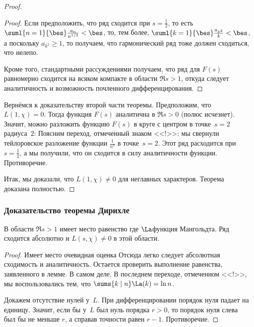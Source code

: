 \documentclass[a4paper]{article}
\begin{document}
\begin{proof}
\begin{proof}
Если предположить, что ряд сходится при $s = \frac12$, то есть $\suml{n=1}{\bes}\frac{a_n}{n^{1/2}}<\bes$,
то, тем более, $\suml{k=1}{\bes}\frac{a_{k^2}}{k}<\bes$, а поскольку $a_{k^2} \ge 1$, то получаем,
что гармонический ряд тоже должен сходиться, что нелепо.

Кроме того, стандартными рассуждениями получаем, что ряд для $F(s)$ равномерно сходится на всяком компакте в области
$\Re s>1$, откуда следует аналитичность и возможность почленного дифференцирования.
\end{proof}

Вернёмся к доказательству второй части теоремы. Предположим, что $L(1,\chi)=0$. Тогда
функция $F(s)$ аналитична в $\Re s>0$ (полюс исчезнет). Значит, можно разложить функцию $F(s)$
в круге с центром в точке~$s=2$ радиуса~$2$:
Поясним переход, отмеченный знаком <<!>>: мы свернули тейлоровское разложение функции $\frac{1}{n^s}$ в точке~${s=2}$.
Этот ряд расходится при $s=\frac12$, а мы получили, что он сходится в силу аналитичности функции.
Противоречие.

Итак, мы доказали, что $L(1,\chi) \neq 0$ для неглавных характеров. Теорема доказана полностью.
\end{proof}

\subsubsection{Доказательство теоремы Дирихле}

\begin{lemma}
В области $\Re s>1$ имеет место равенство
где $\La$\т функция Мангольдта. Ряд сходится абсолютно и $L(s,\chi)\neq 0$ в этой области.
\end{lemma}
\begin{proof}
Имеет место очевидная оценка
Отсюда легко следует абсолютная сходимость и аналитичность. Остается проверить выполнение
равенства, заявленного в лемме. В самом деле,
В последнем переходе, отмеченном <<!>>, мы воспользовались тем, что $\sums{k\mid n}\La(k)=\ln n$.

Докажем отсутствие нулей у~$L$. При дифференцировании порядок нуля падает на единицу.
Значит, если бы у~$L$ был нуль порядка $r > 0$, то порядок нуля слева был бы не меньше $r$,
а справа\т в точности равен $r-1$. Противоречие.
\end{proof}
\end{document}
